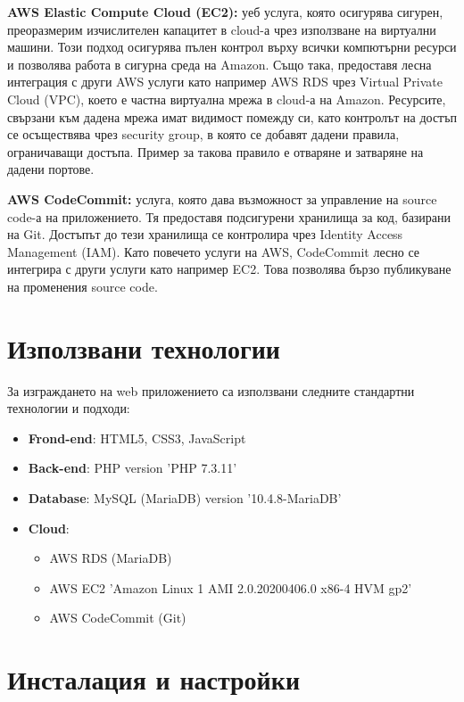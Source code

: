 \documentclass[12pt]{article}
\begin{document}
\noindent \textbf{AWS Elastic Compute Cloud (EC2):} уеб услуга, която осигурява сигурен, преоразмерим изчислителен капацитет в cloud-а чрез използване на виртуални машини. Този подход осигурява пълен контрол върху всички компютърни ресурси и позволява работа в сигурна среда на Amazon. Също така, предоставя лесна интеграция с други AWS услуги като например AWS RDS чрез Virtual Private Cloud (VPC), което е частна виртуална мрежа в cloud-а на Amazon. Ресурсите, свързани към дадена мрежа имат видимост помежду си, като контролът на достъп се осъществява чрез security group, в която се добавят дадени правила, ограничаващи достъпа. Пример за такова правило е отваряне и затваряне на дадени портове. 
\medskip

\noindent \textbf{AWS CodeCommit:} услуга, която дава възможност за управление на source code-а на приложението. Тя предоставя подсигурени хранилища за код, базирани на Git. Достъпът до тези хранилища се контролира чрез Identity Access Management (IAM). Като повечето услуги на AWS, CodeCommit лесно се интегрира с други услуги като например EC2. Това позволява бързо публикуване на променения source code. 
\medskip


\section{Използвани технологии}
\noindent За изграждането на web приложението са използвани следните стандартни технологии и подходи:

\begin{itemize}
\item \textbf{Frond-end}: HTML5, CSS3, JavaScript
\item \textbf{Back-end}: PHP version 'PHP 7.3.11'
\item \textbf{Database}:  MySQL (MariaDB) version '10.4.8-MariaDB'
\item \textbf{Cloud}:
\begin{itemize}
\item AWS RDS (MariaDB)
\item AWS EC2 'Amazon Linux 1 AMI 2.0.20200406.0 x86-4 HVM gp2'
\item AWS CodeCommit (Git) 
\end{itemize}
\end{itemize}


\section{Инсталация и настройки}
\end{document}
